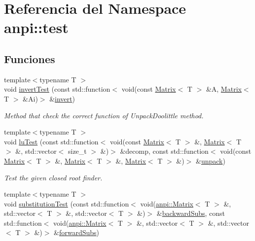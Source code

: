 \hypertarget{namespaceanpi_1_1test}{}\section{Referencia del Namespace anpi\+:\+:test}
\label{namespaceanpi_1_1test}
\subsection*{Funciones}
\begin{DoxyCompactItemize}
\item 
{\footnotesize template$<$typename T $>$ }\\void \hyperlink{namespaceanpi_1_1test_aacf0f9fee77d3af9798f523f4230d8bf}{invert\+Test} (const std\+::function$<$ void(const \hyperlink{classanpi_1_1Matrix}{Matrix}$<$ T $>$ \&A, \hyperlink{classanpi_1_1Matrix}{Matrix}$<$ T $>$ \&Ai)$>$ \&\hyperlink{namespaceanpi_a7b13e1af574b2eb816cb8f65cc2e6c56}{invert})
\begin{DoxyCompactList}\small\item\em Method that check the correct function of Unpack\+Doolittle method. \end{DoxyCompactList}\item 
{\footnotesize template$<$typename T $>$ }\\void \hyperlink{namespaceanpi_1_1test_a0baf1a43bc6d37c8b0bc22587b366656}{lu\+Test} (const std\+::function$<$ void(const \hyperlink{classanpi_1_1Matrix}{Matrix}$<$ T $>$ \&, \hyperlink{classanpi_1_1Matrix}{Matrix}$<$ T $>$ \&, std\+::vector$<$ size\+\_\+t $>$ \&)$>$ \&decomp, const std\+::function$<$ void(const \hyperlink{classanpi_1_1Matrix}{Matrix}$<$ T $>$ \&, \hyperlink{classanpi_1_1Matrix}{Matrix}$<$ T $>$ \&, \hyperlink{classanpi_1_1Matrix}{Matrix}$<$ T $>$ \&)$>$ \&\hyperlink{namespaceanpi_a02b3ba58e1fd11d7b703dceae3032eb0}{unpack})
\begin{DoxyCompactList}\small\item\em Test the given closed root finder. \end{DoxyCompactList}\item 
{\footnotesize template$<$typename T $>$ }\\void \hyperlink{namespaceanpi_1_1test_a9d30d26dcfe2c4fe8c7c98c71546d734}{substitution\+Test} (const std\+::function$<$ void(\hyperlink{classanpi_1_1Matrix}{anpi\+::\+Matrix}$<$ T $>$ \&, std\+::vector$<$ T $>$ \&, std\+::vector$<$ T $>$ \&)$>$ \&\hyperlink{namespaceanpi_a51f75d22ef46354c73e5620dd720f249}{backward\+Subs}, const std\+::function$<$ void(\hyperlink{classanpi_1_1Matrix}{anpi\+::\+Matrix}$<$ T $>$ \&, std\+::vector$<$ T $>$ \&, std\+::vector$<$ T $>$ \&)$>$ \&\hyperlink{namespaceanpi_a3113babdff0dbc4eef36bd0b713a7f25}{forward\+Subs})

\end{DoxyCompactItemize}
